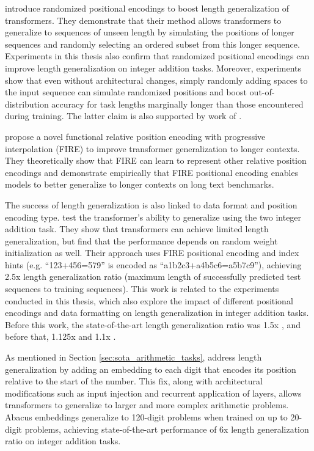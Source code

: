 \cite{ruoss_randomized_2023} introduce randomized positional encodings to boost length generalization of transformers. They demonstrate that their method allows transformers to generalize to sequences of unseen length by simulating the positions of longer sequences and randomly selecting an ordered subset from this longer sequence. Experiments in this thesis also confirm that randomized positional encodings can improve length generalization on integer addition tasks. Moreover, experiments show that even without architectural changes, simply randomly adding spaces to the input sequence can simulate randomized positions and boost out-of-distribution accuracy for task lengths marginally longer than those encountered during training. The latter claim is also supported by work of \cite{shen_positional_2023}.

\cite{li_functional_2024} propose a novel functional relative position encoding with progressive interpolation (FIRE) to improve transformer generalization to longer contexts. They theoretically show that FIRE can learn to represent other relative position encodings and demonstrate empirically that FIRE positional encoding enables models to better generalize to longer contexts on long text benchmarks.

The success of length generalization is also linked to data format and position encoding type. \cite{zhou_transformers_2024} test the transformer's ability to generalize using the two integer addition task. They show that transformers can achieve limited length generalization, but find that the performance depends on random weight initialization as well. Their approach uses FIRE positional encoding and index hints (e.g. ``123+456=579'' is encoded as ``a1b2c3+a4b5c6=a5b7c9''), achieving 2.5x length generalization ratio (maximum length of successfully predicted test sequences to training sequences). This work is related to the experiments conducted in this thesis, which also explore the impact of different positional encodings and data formatting on length generalization in integer addition tasks. Before this work, the state-of-the-art length generalization ratio was 1.5x \parencite{zhou_what_2023}, and before that, 1.125x \parencite{kazemnejad_impact_2023} and 1.1x \parencite{shen_positional_2023}.

As mentioned in Section \ref{sec:sota_arithmetic_tasks}, \cite{mcleish_transformers_2024} address length generalization by adding an embedding to each digit that encodes its position relative to the start of the number. This fix, along with architectural modifications such as input injection and recurrent application of layers, allows transformers to generalize to larger and more complex arithmetic problems. Abacus embeddings generalize to 120-digit problems when trained on up to 20-digit problems, achieving state-of-the-art performance of 6x length generalization ratio on integer addition tasks.

